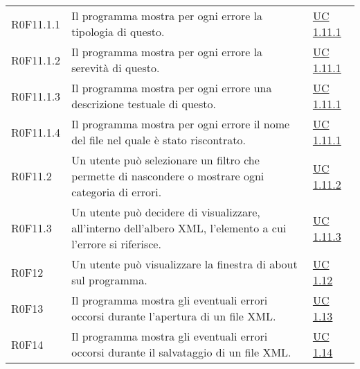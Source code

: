 \begin{center}
\begin{longtable}{p{4.2cm}!{\color{white}\vrule width 0.5mm}p{6cm}!{\color{white}\vrule width 0.5mm}p{2.5cm}!{\color{white}\vrule width 0.5mm}}
				\hspace{4mm}\hypertarget{XER0F11.1.1}{R0F11.1.1} & Il programma mostra per ogni errore la tipologia di questo. & \hyperref[subsec:XEUC1.11.1]{UC 1.11.1}\\
				
				\hspace{4mm}\hypertarget{XER0F11.1.2}{R0F11.1.2} & Il programma mostra per ogni errore la serevità di questo. & \hyperref[subsec:XEUC1.11.1]{UC 1.11.1}\\
				
				\hspace{4mm}\hypertarget{XER0F11.1.3}{R0F11.1.3} & Il programma mostra per ogni errore una descrizione testuale di questo. & \hyperref[subsec:XEUC1.11.1]{UC 1.11.1}\\
				
				\hspace{4mm}\hypertarget{XER0F11.1.4}{R0F11.1.4} & Il programma mostra per ogni errore il nome del file nel quale è stato riscontrato. & \hyperref[subsec:XEUC1.11.1]{UC 1.11.1}\\
		
			\hspace{2mm}\hypertarget{XER0F11.2}{R0F11.2} & Un utente può selezionare un filtro che permette di nascondere o mostrare ogni categoria di errori. & \hyperref[subsec:XEUC1.11.2]{UC 1.11.2}\\
			
			\hspace{2mm}\hypertarget{XER0F11.3}{R0F11.3} & Un utente può decidere di visualizzare, all'interno dell'albero XML, l'elemento a cui l'errore si riferisce. & \hyperref[subsec:XEUC1.11.3]{UC 1.11.3}\\
		
		
		\hspace{0mm}\hypertarget{XER0F12}{R0F12} & Un utente può visualizzare la finestra di about sul programma. & \hyperref[subsec:XEUC1.12]{UC 1.12}\\
		
		
		\hspace{0mm}\hypertarget{XER0F13}{R0F13} & Il programma mostra gli eventuali errori occorsi durante l'apertura di un file XML. & \hyperref[subsec:XEUC1.13]{UC 1.13}\\
		
		\hspace{0mm}\hypertarget{XER0F14}{R0F14} & Il programma mostra gli eventuali errori occorsi durante il salvataggio di un file XML. & \hyperref[subsec:XEUC1.14]{UC 1.14}\\
		

\end{longtable}
\end{center}
